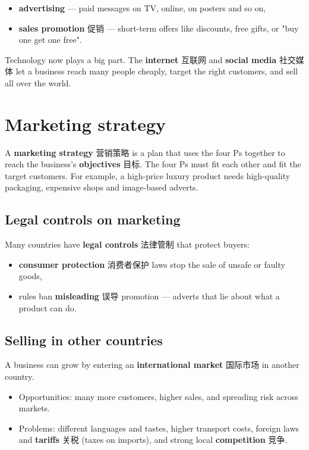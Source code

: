 \documentclass[11pt]{article}
\begin{document}
\begin{itemize}
\item \textbf{advertising} — paid messages on TV, online, on posters and so on,

\item \textbf{sales promotion} 促销 — short-term offers like discounts, free gifts, or "buy one get one free".

\end{itemize}

Technology now plays a big part. The \textbf{internet} 互联网 and \textbf{social media} 社交媒体 let a business reach many people cheaply, target the right customers, and sell all over the world.

\section*{Marketing strategy}

A \textbf{marketing strategy} 营销策略 is a plan that uses the four Ps together to reach the business's \textbf{objectives} 目标. The four Ps must fit each other and fit the target customers. For example, a high-price luxury product needs high-quality packaging, expensive shops and image-based adverts.

\subsection*{Legal controls on marketing}

Many countries have \textbf{legal controls} 法律管制 that protect buyers:

\begin{itemize}
\item \textbf{consumer protection} 消费者保护 laws stop the sale of unsafe or faulty goods,

\item rules ban \textbf{misleading} 误导 promotion — adverts that lie about what a product can do.

\end{itemize}

\subsection*{Selling in other countries}

A business can grow by entering an \textbf{international market} 国际市场 in another country.

\begin{itemize}
\item Opportunities: many more customers, higher sales, and spreading risk across markets.

\item Problems: different languages and tastes, higher transport costs, foreign laws and \textbf{tariffs} 关税 (taxes on imports), and strong local \textbf{competition} 竞争.

\end{itemize}
\end{document}
